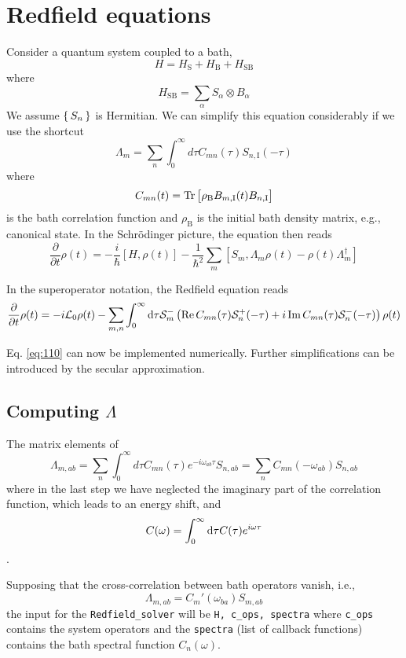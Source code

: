 \documentclass[a4paper,12pt]{book}
\newcommand{\mc}[1]{\mathcal{#1}}
\newcommand{\eq}[1]{Eq. \eqref{#1}}
\newcommand{\be}{\begin{equation}}
\newcommand{\ee}{\end{equation}}
\renewcommand{\Re}{\operatorname{Re}}
\renewcommand{\Im}{\operatorname{Im}}
\begin{document}
\section{Redfield equations}
Consider a quantum system coupled to a bath,
\be
H = H_\text{S} + H_\text{B} + H_\text{SB}
\ee
where
\be
H_\text{SB} = \sum_\alpha S_\alpha \otimes B_\alpha
\ee
We assume $\set{S_n}$ is Hermitian.
We can simplify this equation considerably if we use the shortcut \be  \Lambda _{m}=\sum _{n}\int _{0}^{\infty }d\tau C_{mn}(\tau )S_{n,\mathrm {I} }(-\tau )\ee
where
\be C_{mn}(t) = \tr\sbr{\rho_\text{B} B_{m, \text{I}}(t) B_{n, \text{I}}} \ee is the bath correlation function and $\rho_\text{B}$ is the initial bath density matrix, e.g., canonical state.
In the Schrödinger picture, the equation then reads
\be {\frac {\partial }{\partial t}}\rho (t)=-{\frac {i}{\hbar }}[H,\rho (t)]-{\frac {1}{\hbar ^{2}}}\sum _{m}[S_{m},\Lambda _{m}\rho (t)-\rho (t)\Lambda _{m}^{\dagger }]
\ee

In the superoperator notation, the Redfield equation reads
\be
 {\frac {\partial }{\partial t}}\rho (t)=-i \mc{L}_0 \rho(t) - \sum _{m, n}\int_0^\infty \dif \tau \mc{S}^-_{m} \del{ \Re C_{mn}(\tau) \mc{S}_n^+(-\tau) + i \Im C_{mn}(\tau) \mc{S}_n^-(-\tau)  } \rho(t)
\label{eq:110}
\ee

\eq{eq:110} can now be implemented numerically. Further simplifications can be introduced by the secular approximation.
\subsection{Computing $\Lambda$}
The matrix elements of
\be
\Lambda_{m, ab} =\sum _{n}\int _{0}^{\infty }d\tau C_{mn}(\tau ) e^{-i\omega_{ab} \tau}S_{n, ab} = \sum_{n} C_{mn}(-\omega_{ab}) S_{n, ab}
\ee
where in the last step we have neglected the imaginary part of the correlation function, which leads to an energy shift, and
\be C(\omega) = \int_0^\infty \dif \tau C(\tau) e^{i\omega \tau}
\ee.

Supposing that the cross-correlation between bath operators vanish, i.e.,
\be
\Lambda_{m, ab} =  C_{m}'(\omega_{ba}) S_{m, ab}
\ee  the input for the \verb|Redfield_solver| will be \verb|H, c_ops, spectra|
where \verb|c_ops| contains the system operators and the \verb|spectra| (list of callback functions) contains the bath spectral function $C_n(\omega)$.
\end{document}
